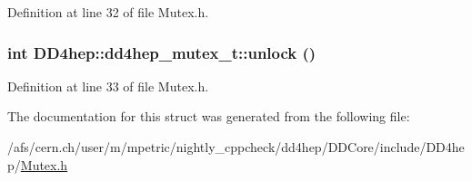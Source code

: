 Definition at line 32 of file Mutex.h.\hypertarget{struct_d_d4hep_1_1dd4hep__mutex__t_af41a64ce1a44de41262fb127d4737d34}{
\subsubsection[{unlock}]{\setlength{\rightskip}{0pt plus 5cm}int DD4hep::dd4hep\_\-mutex\_\-t::unlock ()}}
\label{struct_d_d4hep_1_1dd4hep__mutex__t_af41a64ce1a44de41262fb127d4737d34}


Definition at line 33 of file Mutex.h.

The documentation for this struct was generated from the following file:\begin{DoxyCompactItemize}
\item 
/afs/cern.ch/user/m/mpetric/nightly\_\-cppcheck/dd4hep/DDCore/include/DD4hep/\hyperlink{_mutex_8h}{Mutex.h}\end{DoxyCompactItemize}
